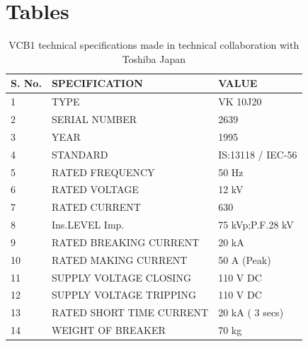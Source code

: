 \documentclass{report}
\begin{document}
	\section{Tables}
	\begin{table}[h]
		\centering
		\begin{tabular}{@{}lll@{}}
			\toprule
			\textbf{S. No.} & \textbf{SPECIFICATION}   & \textbf{VALUE}    \\ \midrule
			1               & TYPE                     & VK 10J20          \\
			2               & SERIAL NUMBER            & 2639              \\
			3               & YEAR                     & 1995              \\
			4               & STANDARD                 & IS:13118 / IEC-56 \\
			5               & RATED FREQUENCY          & 50 Hz             \\
			6               & RATED VOLTAGE            & 12 kV             \\
			7               & RATED CURRENT            & 630               \\
			8               & Ins.LEVEL Imp.           & 75 kVp;P.F.28 kV  \\
			9               & RATED BREAKING CURRENT   & 20 kA             \\
			10              & RATED MAKING CURRENT     & 50 A (Peak)       \\
			11              & SUPPLY VOLTAGE CLOSING   & 110 V DC          \\
			12              & SUPPLY VOLTAGE TRIPPING  & 110 V DC          \\
			13              & RATED SHORT TIME CURRENT & 20 kA ( 3 secs)   \\
			14              & WEIGHT OF BREAKER        & 70 kg             \\ \bottomrule
		\end{tabular}
		\caption{VCB1 technical specifications made in technical collaboration with Toshiba Japan}
		\label{vcb1_nameplate}
	\end{table}
\end{document}

